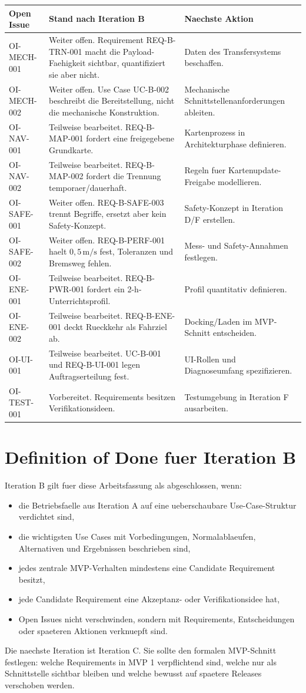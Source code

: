 \begin{longtable}{L{0.16\textwidth} L{0.40\textwidth} L{0.28\textwidth}}
\toprule
Open Issue & Stand nach Iteration B & Naechste Aktion \\
\midrule
OI-MECH-001 & Weiter offen. Requirement REQ-B-TRN-001 macht die Payload-Faehigkeit sichtbar, quantifiziert sie aber nicht. & Daten des Transfersystems beschaffen. \\
OI-MECH-002 & Weiter offen. Use Case UC-B-002 beschreibt die Bereitstellung, nicht die mechanische Konstruktion. & Mechanische Schnittstellenanforderungen ableiten. \\
OI-NAV-001 & Teilweise bearbeitet. REQ-B-MAP-001 fordert eine freigegebene Grundkarte. & Kartenprozess in Architekturphase definieren. \\
OI-NAV-002 & Teilweise bearbeitet. REQ-B-MAP-002 fordert die Trennung temporaer/dauerhaft. & Regeln fuer Kartenupdate-Freigabe modellieren. \\
OI-SAFE-001 & Weiter offen. REQ-B-SAFE-003 trennt Begriffe, ersetzt aber kein Safety-Konzept. & Safety-Konzept in Iteration D/F erstellen. \\
OI-SAFE-002 & Weiter offen. REQ-B-PERF-001 haelt $0{,}5\,\mathrm{m/s}$ fest, Toleranzen und Bremsweg fehlen. & Mess- und Safety-Annahmen festlegen. \\
OI-ENE-001 & Teilweise bearbeitet. REQ-B-PWR-001 fordert ein 2-h-Unterrichtsprofil. & Profil quantitativ definieren. \\
OI-ENE-002 & Teilweise bearbeitet. REQ-B-ENE-001 deckt Rueckkehr als Fahrziel ab. & Docking/Laden im MVP-Schnitt entscheiden. \\
OI-UI-001 & Teilweise bearbeitet. UC-B-001 und REQ-B-UI-001 legen Auftragserteilung fest. & UI-Rollen und Diagnoseumfang spezifizieren. \\
OI-TEST-001 & Vorbereitet. Requirements besitzen Verifikationsideen. & Testumgebung in Iteration F ausarbeiten. \\
\bottomrule
\end{longtable}

\section{Definition of Done fuer Iteration B}

Iteration B gilt fuer diese Arbeitsfassung als abgeschlossen, wenn:
\begin{itemize}
  \item die Betriebsfaelle aus Iteration A auf eine ueberschaubare Use-Case-Struktur verdichtet sind,
  \item die wichtigsten Use Cases mit Vorbedingungen, Normalablaeufen, Alternativen und Ergebnissen beschrieben sind,
  \item jedes zentrale MVP-Verhalten mindestens eine Candidate Requirement besitzt,
  \item jede Candidate Requirement eine Akzeptanz- oder Verifikationsidee hat,
  \item Open Issues nicht verschwinden, sondern mit Requirements, Entscheidungen oder spaeteren Aktionen verknuepft sind.
\end{itemize}

Die naechste Iteration ist Iteration C. Sie sollte den formalen MVP-Schnitt festlegen: welche Requirements in MVP 1 verpflichtend sind, welche nur als Schnittstelle sichtbar bleiben und welche bewusst auf spaetere Releases verschoben werden.
